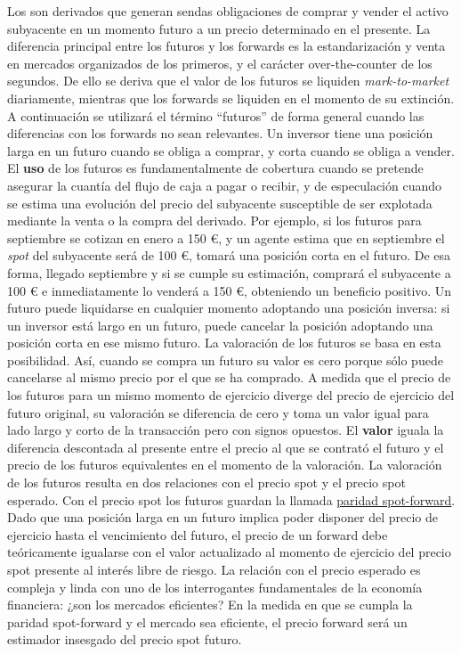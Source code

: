 \documentclass{nuevotema}
\begin{document}
Los  son derivados que generan sendas obligaciones de comprar y vender el activo subyacente en un momento futuro a un precio determinado en el presente. La diferencia principal entre los futuros y los forwards es la estandarización y venta en mercados organizados de los primeros, y el carácter over-the-counter de los segundos. De ello se deriva que el valor de los futuros se liquiden \textit{mark-to-market} diariamente, mientras que los forwards se liquiden en el momento de su extinción. A continuación se utilizará el término ``futuros'' de forma general cuando las diferencias con los forwards no sean relevantes. Un inversor tiene una posición larga en un futuro cuando se obliga a comprar, y corta cuando se obliga a vender. El \textbf{uso} de los futuros es fundamentalmente de cobertura cuando se pretende asegurar la cuantía del flujo de caja a pagar o recibir, y de especulación cuando se estima una evolución del precio del subyacente susceptible de ser explotada mediante la venta o la compra del derivado. Por ejemplo, si los futuros para septiembre se cotizan en enero a 150 €, y un agente estima que en septiembre el \textit{spot} del subyacente será de 100 €, tomará una posición corta en el futuro. De esa forma, llegado septiembre y si se cumple su estimación, comprará el subyacente a 100 € e inmediatamente lo venderá a 150 €, obteniendo un beneficio positivo. Un futuro puede liquidarse en cualquier momento adoptando una posición inversa: si un inversor está largo en un futuro, puede cancelar la posición adoptando una posición corta en ese mismo futuro. La valoración de los futuros se basa en esta posibilidad. Así, cuando se compra un futuro su valor es cero porque sólo puede cancelarse al mismo precio por el que se ha comprado. A medida que el precio de los futuros para un mismo momento de ejercicio diverge del precio de ejercicio del futuro original, su valoración se diferencia de cero y toma un valor igual para lado largo y corto de la transacción pero con signos opuestos. El \textbf{valor} iguala la diferencia descontada al presente entre el precio al que se contrató el futuro y el precio de los futuros equivalentes en el momento de la valoración. La valoración de los futuros resulta en dos relaciones con el precio spot y el precio spot esperado. Con el precio spot los futuros guardan la llamada \underline{paridad spot-forward}. Dado que una posición larga en un futuro implica poder disponer del precio de ejercicio hasta el vencimiento del futuro, el precio de un forward debe teóricamente igualarse con el valor actualizado al momento de ejercicio del precio spot presente al interés libre de riesgo. La relación con el precio esperado es compleja y linda con uno de los interrogantes fundamentales de la economía financiera: ¿son los mercados eficientes? En la medida en que se cumpla la paridad spot-forward y el mercado sea eficiente, el precio forward será un estimador insesgado del precio spot futuro.
\end{document}
